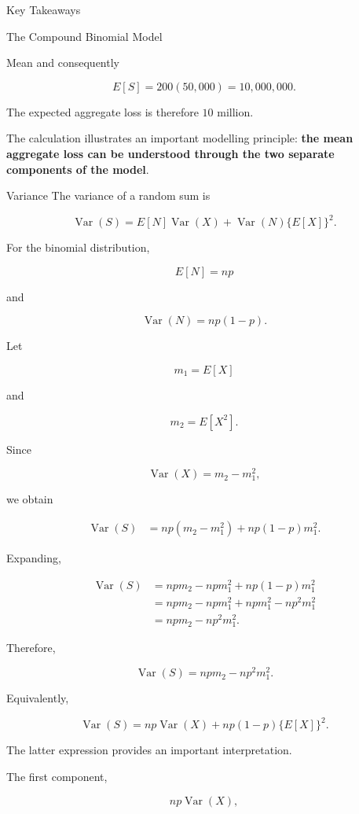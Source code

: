 \documentclass[
  ignorenonframetext,
  aspectratio=169,
]{beamer}
\begin{document}
\begin{frame}{Key Takeaways}
\begin{block}{The Compound Binomial Model}
\begin{block}{Mean}
and consequently

\[
E[S]
=
200(50{,}000)
=
10{,}000{,}000.
\]

The expected aggregate loss is therefore \(10\) million.

The calculation illustrates an important modelling principle:
\textbf{the mean aggregate loss can be understood through the two
separate components of the model}.
\end{block}

\begin{block}{Variance}
\protect{}\label{variance}
The variance of a random sum is

\[
\operatorname{Var}(S)
=
E[N]\operatorname{Var}(X)
+
\operatorname{Var}(N)\{E[X]\}^2.
\]

For the binomial distribution,

\[
E[N]=np
\]

and

\[
\operatorname{Var}(N)=np(1-p).
\]

Let

\[
m_1=E[X]
\]

and

\[
m_2=E[X^2].
\]

Since

\[
\operatorname{Var}(X)=m_2-m_1^2,
\]

we obtain

\[
\begin{aligned}
\operatorname{Var}(S)
&=
np(m_2-m_1^2)
+
np(1-p)m_1^2.
\end{aligned}
\]

Expanding,

\[
\begin{aligned}
\operatorname{Var}(S)
&=
npm_2-npm_1^2
+
np(1-p)m_1^2\\
&=
npm_2-npm_1^2
+npm_1^2-np^2m_1^2\\
&=
npm_2-np^2m_1^2.
\end{aligned}
\]

Therefore,

\[
\boxed{
\operatorname{Var}(S)
=
npm_2-np^2m_1^2.
}
\]

Equivalently,

\[
\boxed{
\operatorname{Var}(S)
=
np\operatorname{Var}(X)
+
np(1-p)\{E[X]\}^2.
}
\]

The latter expression provides an important interpretation.

The first component,

\[
np\operatorname{Var}(X),
\]


\end{block}
\end{block}
\end{frame}
\end{document}
